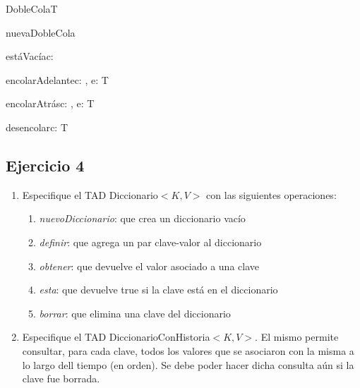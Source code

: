 \begin{tad}{DobleCola}{T}

	\begin{proc}{nuevaDobleCola}{}{\tadtype}
	\end{proc}

	\begin{proc}{estáVacía}{\In c: \tadtype}{\bool}
	\end{proc}

	\begin{proc}{encolarAdelante}{\Inout c: \tadtype, \In e: T}{}
	\end{proc}

	\begin{proc}{encolarAtrás}{\Inout c: \tadtype, \In e: T}{}
	\end{proc}

	\begin{proc}{desencolar}{\Inout c: \tadtype}{T}
	\end{proc}

\end{tad}

\subsection{Ejercicio 4}

\begin{enumerate}
	\item Especifique el TAD Diccionario$<K,V>$ con las siguientes operaciones:

	      \begin{enumerate}[label=\alph*)]
		      \item \textit{nuevoDiccionario}: que crea un diccionario vacío
		      \item \textit{definir}: que agrega un par clave-valor al diccionario
		      \item \textit{obtener}: que devuelve el valor asociado a una clave
		      \item \textit{esta}: que devuelve true si la clave está en el diccionario
		      \item \textit{borrar}: que elimina una clave del diccionario
	      \end{enumerate}

	\item Especifique el TAD DiccionarioConHistoria$<K,V>$. El mismo permite consultar, para cada clave, todos los valores que se asociaron con la misma a lo largo dell tiempo (en orden). Se debe poder hacer dicha consulta aún si la clave fue borrada.
\end{enumerate}

